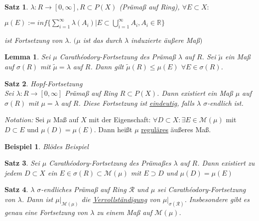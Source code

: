 \documentclass[11pt]{memoir}
\theoremstyle{break}
\newtheorem{Beispiel}{Beispiel}[chapter]
\newtheorem{Lemma}{Lemma}[chapter]
\newtheorem{Satz}{Satz}[chapter]
\newcommand{\cara}{Carathéodory-Fortsetzung}
\begin{document}
\begin{Satz}
$\lambda: R \rightarrow [0, \infty], {}R \subset P(X)$ (Prämaß auf Ring), $\forall {}E \subset X:$ \\
\begin{center}
$\mu(E):= inf\{ \sum\limits_{i=1}^{\infty} \lambda(A_i) | E \subset \bigcup\limits_{i=1}^{\infty} A_i, A_i \in \mathbb{R}\}$
\end{center}
ist Fortsetzung von $\lambda$. $(\mu$ ist das durch $\lambda$ induzierte äußere Maß$)$
\end{Satz}

\begin{Lemma}
Sei $\mu$ \cara{} des Prämaß $\lambda$ auf $R$. Sei $\tilde{\mu}$ ein Maß auf $\sigma(R)$ mit $\tilde{\mu} = \lambda$ auf $R$. Dann gilt $\tilde{\mu}(R) \leq \mu(E)$ $\forall E \in \sigma(R)$.
\end{Lemma}

\begin{Satz} \emph{Hopf-Fortsetzung} \\
Sei $\lambda: R \rightarrow [0, \infty]$ Prämaß auf Ring $R \subset P(X)$. Dann existiert ein Maß $\mu$ auf $\sigma(R)$ mit $\mu =\lambda$ auf $R$. Diese Fortsetzung ist \underline{eindeutig}, falls $\lambda$ $\sigma$-endlich ist.
\end{Satz}

\emph{Notation:}
Sei $\mu$ Maß auf $X$ mit der Eigenschaft: $\forall D \subset X: \exists E \in \mathscr{M}(\mu)$ mit $D \subset E$ und $\mu(D) = \mu(E)$. Dann heißt $\mu$ \underline{reguläres} äußeres Maß.

\begin{Beispiel}
Blödes Beispiel
\end{Beispiel}

\begin{Satz}
Sei $\mu$ \cara{} des Prämaßes $\lambda$ auf $R$. Dann existiert zu jedem $D \subset X$ ein $E \in \sigma(R) \subset \mathscr M(\mu)$ mit $E \supset D$ und $\mu(D) = \mu(E)$
\end{Satz}

\begin{Satz}
$\lambda$  $\sigma$-endliches Prämaß auf Ring $\mathscr R$ und $\mu$ sei \cara{} von $\lambda$. Dann ist $\mu|_{\mathscr M(\mu)}$ die \underline{Vervollständigung} von $\mu|_{\sigma(\mathscr R)}$. Insbesondere gibt es genau eine Fortsetzung von $\lambda$ zu einem Maß auf $\mathscr M(\mu)$.
\end{Satz}
\end{document}
